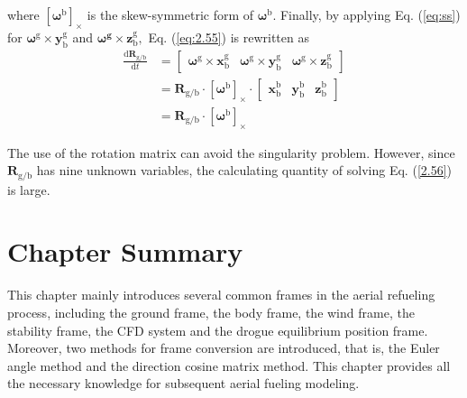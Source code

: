 where ${{\left[{{\boldsymbol{\omega}}^{\text{b}}}\right]}_{\times}}$
is the skew-symmetric form of ${{\boldsymbol{\omega}}^{\text{b}}}$.
Finally, by applying Eq. (\ref{eq:ss}) for ${\boldsymbol{\omega}}^{\text{g}}\times\mathbf{y}_{\text{b}}^{\text{g}}$
and $\mathbf{{\boldsymbol{\omega}}^{\text{g}}\times z}_{\text{b}}^{\text{g}},$
Eq. (\ref{eq:2.55}) is rewritten as 
\begin{equation}
\begin{array}{ll}
\frac{\text{d}{{\mathbf{R}}_{\text{{g}/{b}}}}}{\text{d}t} & =\left[\begin{array}{ccc}
{\boldsymbol{\omega}}^{\text{g}}\times\mathbf{x}_{\text{b}}^{\text{g}} & {\boldsymbol{\omega}}^{\text{g}}\times\mathbf{y}_{\text{b}}^{\text{g}} & {\boldsymbol{\omega}}^{\text{g}}\times\mathbf{z}_{\text{b}}^{\text{g}}\end{array}\right]\\
& ={{\mathbf{R}}_{\text{{g}/{b}}}}\cdot{\left[{{\boldsymbol{\omega}}^{\text{b}}}\right]}_{\times}\cdot\left[\begin{array}{ccc}
\mathbf{x}_{\text{b}}^{\text{b}} & \mathbf{y}_{\text{b}}^{\text{b}} & \mathbf{z}_{\text{b}}^{\text{b}}\end{array}\right]\\
& ={{\mathbf{R}}_{\text{{g}/{b}}}}\cdot{{\left[{{\boldsymbol{\omega}}^{\text{b}}}\right]}_{\times}}
\end{array}\label{2.56}
\end{equation}

The use of the rotation matrix can avoid the singularity problem.
However, since ${{\mathbf{R}}_{\text{{g}/{b}}}}$ has nine unknown
variables, the calculating quantity of solving Eq. (\ref{2.56}) is
large. 

\section{Chapter Summary}

This chapter mainly introduces several common frames in the aerial
refueling process, including the ground frame, the body frame, the
wind frame, the stability frame, the CFD system and the drogue equilibrium
position frame. Moreover, two methods for frame conversion are introduced,
that is, the Euler angle method and the direction cosine matrix method.
This chapter provides all the necessary knowledge for subsequent aerial
fueling modeling.
